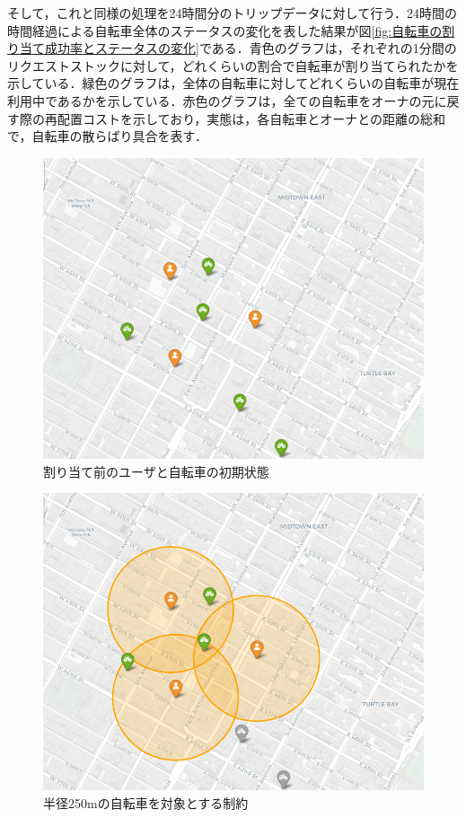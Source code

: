           \par そして，これと同様の処理を24時間分のトリップデータに対して行う．24時間の時間経過による自転車全体のステータスの変化を表した結果が図\ref{fig:自転車の割り当て成功率とステータスの変化}である．青色のグラフは，それぞれの1分間のリクエストストックに対して，どれくらいの割合で自転車が割り当てられたかを示している．緑色のグラフは，全体の自転車に対してどれくらいの自転車が現在利用中であるかを示している．赤色のグラフは，全ての自転車をオーナの元に戻す際の再配置コストを示しており，実態は，各自転車とオーナとの距離の総和で，自転車の散らばり具合を表す．

          \begin{figure}[htbp]
            \centering
            \includegraphics[scale=0.35]
            {figures/simulation1.png}
            \caption{割り当て前のユーザと自転車の初期状態}
            \label{fig:割り当て前のユーザと自転車の初期状態}
          \end{figure}

          \begin{figure}[htbp]
            \centering
            \includegraphics[scale=0.35]
            {figures/simulation2.png}
            \caption{半径250mの自転車を対象とする制約}
            \label{fig:半径250mの自転車を対象とする制約}
          \end{figure}

